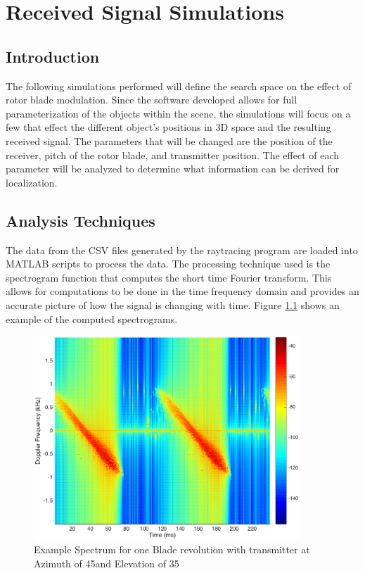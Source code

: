 \chapter{Received Signal Simulations} \label{ch:simulations}

\section{Introduction}
The following simulations performed will define the search space on the effect of rotor blade modulation. Since the software developed allows for full parameterization of the objects within the scene, the simulations will focus on a few that effect the different object's positions in 3D space and the resulting received signal. The parameters that will be changed are the position of the receiver, pitch of the rotor blade, and transmitter position. The effect of each parameter will be analyzed to determine what information can be derived for localization.


\section{Analysis Techniques}
The data from the CSV files generated by the raytracing program are loaded into MATLAB scripts to process the data. The processing technique used is the spectrogram function that computes the short time Fourier transform. This allows for computations to be done in the time frequency domain and provides an accurate picture of how the signal is changing with time. Figure \ref{fig:test_spec} shows an example of the computed spectrograms.


\begin{figure}
	\begin{center}
		\includegraphics[width=10cm]{images/simulation/test_analysis_spectrogram.eps}
		\caption{Example Spectrum for one Blade revolution with transmitter at Azimuth of 45\textdegree \space and Elevation of 35\textdegree}
		\label{fig:test_spec}
	\end{center}
\end{figure}

